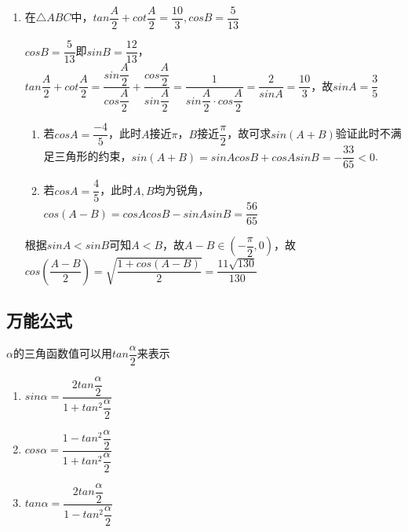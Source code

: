 \begin{enumerate}
    \item 在$\triangle ABC$中，$tan\dfrac{A}{2} + cot\dfrac{A}{2} = \dfrac{10}{3}, cosB = \dfrac{5}{13}$
    \begin{jieda}
        $cosB = \dfrac{5}{13}$即$sinB = \dfrac{12}{13}$，\\
        $tan\dfrac{A}{2} + cot\dfrac{A}{2} = \dfrac{sin\dfrac{A}{2}}{cos\dfrac{A}{2}} + \dfrac{cos\dfrac{A}{2}}{sin\dfrac{A}{2}} = \dfrac{1}{sin\dfrac{A}{2} \cdot cos\dfrac{A}{2}} = \dfrac{2}{sinA} = \dfrac{10}{3}$，故$sinA = \dfrac{3}{5}$ 
        \begin{enumerate}
            \item 若$cosA = \dfrac{-4}{5}$，此时$A$接近$\pi$，$B$接近$\dfrac{\pi}{2}$，故可求$sin(A+B)$验证此时不满足三角形的约束，$sin(A+B) = sinA cosB + cosA sinB = -\dfrac{33}{65} < 0$.
            \item 若$cosA = \dfrac{4}{5}$，此时$A, B$均为锐角，$cos(A-B) = cosA cosB - sinA sinB = \dfrac{56}{65}$
        \end{enumerate}
        根据$sinA < sinB$可知$A < B$，故$A - B \in (-\dfrac{\pi}{2}, 0)$，故$cos(\dfrac{A-B}{2}) = \sqrt{\dfrac{1+cos(A-B)}{2}} = \dfrac{11\sqrt{130}}{130}$
    \end{jieda}
\end{enumerate}

\subsection*{万能公式}
$\alpha$的三角函数值可以用$tan\dfrac{\alpha}{2}$来表示
\begin{enumerate}
    \item $sin\alpha = \dfrac{2tan\dfrac{\alpha}{2}}{1+tan^2\dfrac{\alpha}{2}}$
    \item $cos\alpha = \dfrac{1-tan^2\dfrac{\alpha}{2}}{1+tan^2\dfrac{\alpha}{2}}$
    \item $tan\alpha = \dfrac{2tan\dfrac{\alpha}{2}}{1-tan^2\dfrac{\alpha}{2}}$
\end{enumerate}

